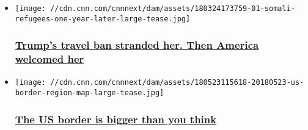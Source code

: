 \begin{itemize}
\item
  \href{/2018/03/28/us/travel-ban-somali-refugees-one-year-later/index.html}{}

  \texttt{[image: //cdn.cnn.com/cnnnext/dam/assets/180324173759-01-somali-refugees-one-year-later-large-tease.jpg]}

  \hypertarget{trumps-travel-ban-stranded-her-then-america-welcomed-her}{%
  \subsubsection{\texorpdfstring{\href{/2018/03/28/us/travel-ban-somali-refugees-one-year-later/index.html}{Trump's
  travel ban stranded her. Then America welcomed
  her}}{Trump's travel ban stranded her. Then America welcomed her}}\label{trumps-travel-ban-stranded-her-then-america-welcomed-her}}
\item
  \href{/2018/05/23/us/border-zone-immigration-checks/index.html}{}

  \texttt{[image: //cdn.cnn.com/cnnnext/dam/assets/180523115618-20180523-us-border-region-map-large-tease.jpg]}

  \hypertarget{the-us-border-is-bigger-than-you-think}{%
  \subsubsection{\texorpdfstring{\href{/2018/05/23/us/border-zone-immigration-checks/index.html}{The
  US border is bigger than you
  think}}{The US border is bigger than you think}}\label{the-us-border-is-bigger-than-you-think}}
\end{itemize}

